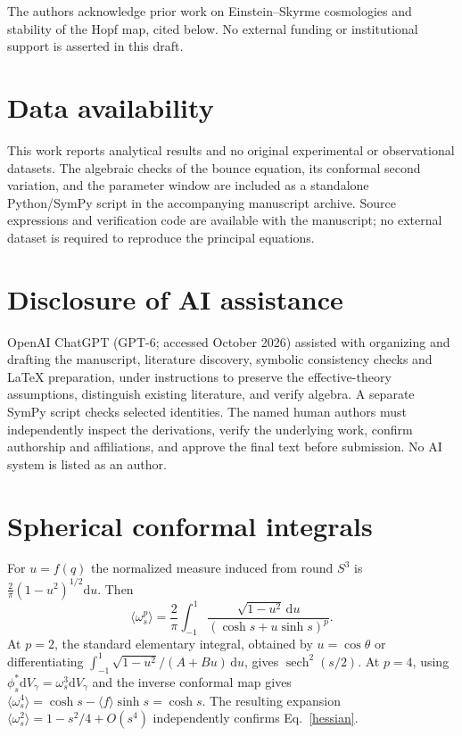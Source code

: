\documentclass[aps,prd,reprint,longbibliography,nofootinbib,superscriptaddress]{revtex4-2}
\newcommand{\dd}{\mathrm d}
\begin{document}
\begin{acknowledgments}
The authors acknowledge prior work on Einstein--Skyrme cosmologies and stability of the Hopf map, cited below. No external funding or institutional support is asserted in this draft.
\end{acknowledgments}

\section*{Data availability}
This work reports analytical results and no original experimental or observational datasets. The algebraic checks of the bounce equation, its conformal second variation, and the parameter window are included as a standalone Python/SymPy script in the accompanying manuscript archive. Source expressions and verification code are available with the manuscript; no external dataset is required to reproduce the principal equations.

\section*{Disclosure of AI assistance}
OpenAI ChatGPT (GPT-6; accessed October 2026) assisted with organizing and drafting the manuscript, literature discovery, symbolic consistency checks and LaTeX preparation, under instructions to preserve the effective-theory assumptions, distinguish existing literature, and verify algebra. A separate SymPy script checks selected identities. The named human authors must independently inspect the derivations, verify the underlying work, confirm authorship and affiliations, and approve the final text before submission. No AI system is listed as an author.

\appendix
\section{Spherical conformal integrals}
For $u=f(q)$ the normalized measure induced from round $S^3$ is $\frac2\pi(1-u^2)^{1/2}\dd u$. Then
\begin{equation}
 \langle\omega_s^p\rangle=\frac2\pi\int_{-1}^1\frac{\sqrt{1-u^2}\,\dd u}{(\cosh s+u\sinh s)^p}.
\end{equation}
At $p=2$, the standard elementary integral, obtained by $u=\cos\theta$ or differentiating $\int_{-1}^1\sqrt{1-u^2}/(A+Bu)\,\dd u$, gives $\operatorname{sech}^2(s/2)$. At $p=4$, using $\phi_s^*\dd V_\gamma=\omega_s^3\dd V_\gamma$ and the inverse conformal map gives $\langle\omega_s^4\rangle=\cosh s-\langle f\rangle\sinh s=\cosh s$. The resulting expansion $\langle\omega_s^2\rangle=1-s^2/4+O(s^4)$ independently confirms Eq.~\eqref{hessian}.
\end{document}
